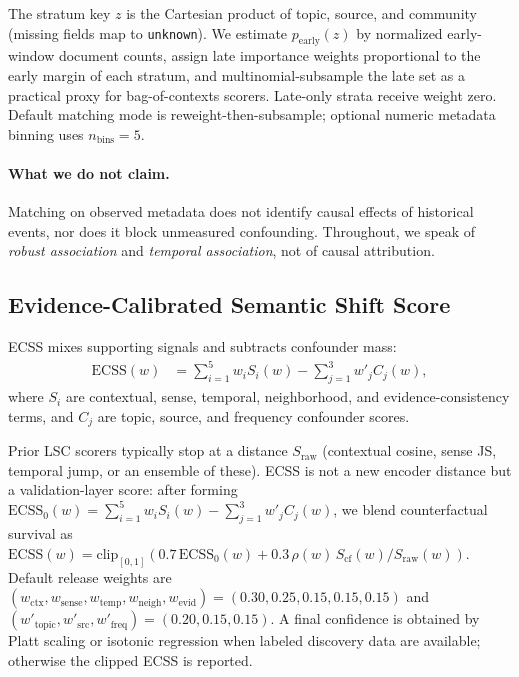 \documentclass{llncs}
\newcommand{\addrev}[1]{{\color{blue}#1}}
\begin{document}
\addrev{The stratum key $z$ is the Cartesian product of topic, source, and community (missing fields map to \texttt{unknown}).
We estimate $p_{\mathrm{early}}(z)$ by normalized early-window document counts, assign late importance weights proportional to the early margin of each stratum, and multinomial-subsample the late set as a practical proxy for bag-of-contexts scorers.
Late-only strata receive weight zero.
Default matching mode is reweight-then-subsample; optional numeric metadata binning uses $n_{\mathrm{bins}}=5$.}

\paragraph{What we do not claim.}
Matching on observed metadata does not identify causal effects of historical events, nor does it block unmeasured confounding.
Throughout, we speak of \emph{robust association} and \emph{temporal association}, not of causal attribution.

\subsection{Evidence-Calibrated Semantic Shift Score}
ECSS mixes supporting signals and subtracts confounder mass:
\begin{equation}
\begin{aligned}
\mathrm{ECSS}(w)
&=
\sum_{i=1}^{5} w_i S_i(w)
-
\sum_{j=1}^{3} w'_j C_j(w),
\end{aligned}
\end{equation}
where $S_i$ are contextual, sense, temporal, neighborhood, and evidence-consistency terms, and $C_j$ are topic, source, and frequency confounder scores.


\addrev{Prior LSC scorers typically stop at a distance $S_{\mathrm{raw}}$ (contextual cosine, sense JS, temporal jump, or an ensemble of these).
ECSS is not a new encoder distance but a validation-layer score:
after forming
$\mathrm{ECSS}_0(w)=\sum_{i=1}^{5} w_i S_i(w)-\sum_{j=1}^{3} w'_j C_j(w)$,
we blend counterfactual survival as
$\mathrm{ECSS}(w)=\mathrm{clip}_{[0,1]}(0.7\,\mathrm{ECSS}_0(w)+0.3\,\rho(w)\,S_{\mathrm{cf}}(w)/S_{\mathrm{raw}}(w))$.
Default release weights are
$(w_{\mathrm{ctx}},w_{\mathrm{sense}},w_{\mathrm{temp}},w_{\mathrm{neigh}},w_{\mathrm{evid}})=(0.30,0.25,0.15,0.15,0.15)$
and
$(w'_{\mathrm{topic}},w'_{\mathrm{src}},w'_{\mathrm{freq}})=(0.20,0.15,0.15)$.}
A final confidence is obtained by Platt scaling or isotonic regression when labeled discovery data are available; otherwise the clipped ECSS is reported.
\end{document}
